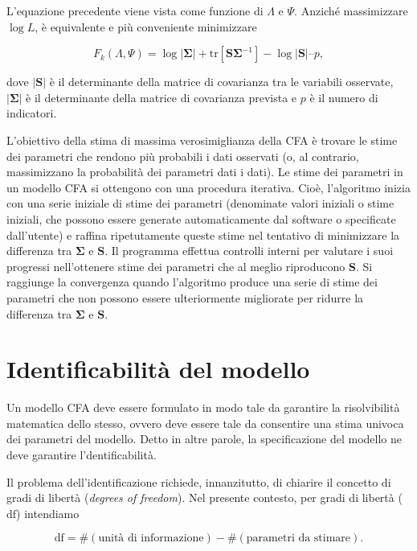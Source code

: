 \documentclass[
  11pt,
]{krantz}
\theoremstyle{definition}
\theoremstyle{definition}
\theoremstyle{definition}
\theoremstyle{definition}
\theoremstyle{remark}
\begin{document}
L'equazione precedente viene vista come funzione di \(\Lambda\) e \(\Psi\). Anziché massimizzare \(\log L\), è equivalente e più conveniente minimizzare

\[
F_{k}(\Lambda, \Psi) = \log |\boldsymbol{\Sigma}| + \mbox{tr}[\boldsymbol{S}\boldsymbol{\Sigma}^{-1}]  - \log|\boldsymbol{S}| – p,
\]

dove \(|\boldsymbol{S}|\) è il determinante della matrice di covarianza tra le variabili osservate, \(|\boldsymbol{\Sigma}|\) è il determinante della matrice di covarianza prevista e \(p\) è il numero di indicatori.

L'obiettivo della stima di massima verosimiglianza della CFA è trovare le stime dei parametri che rendono più probabili i dati osservati (o, al contrario, massimizzano la probabilità dei parametri dati i dati). Le stime dei parametri in un modello CFA si ottengono con una procedura iterativa. Cioè, l'algoritmo inizia con una serie iniziale di stime dei parametri (denominate valori iniziali o stime iniziali, che possono essere generate automaticamente dal software o specificate dall'utente) e raffina ripetutamente queste stime nel tentativo di minimizzare la differenza tra \(\boldsymbol{\Sigma}\) e \(\boldsymbol{S}\). Il programma effettua controlli interni per valutare i suoi progressi nell'ottenere stime dei parametri che al meglio riproducono \(\boldsymbol{S}\). Si raggiunge la convergenza quando l'algoritmo produce una serie di stime dei parametri che non possono essere ulteriormente migliorate per ridurre la differenza tra \(\boldsymbol{\Sigma}\) e \(\boldsymbol{S}\).

\hypertarget{identificabilituxe0-del-modello}{%
\section{Identificabilità del modello}\label{identificabilituxe0-del-modello}}

Un modello CFA deve essere formulato in modo tale da garantire la risolvibilità matematica dello stesso, ovvero deve essere tale da consentire una stima univoca dei parametri del modello. Detto in altre parole, la specificazione del modello ne deve garantire l'dentificabilità.

Il problema dell'identificazione richiede, innanzitutto, di chiarire il concetto di gradi di libertà (\emph{degrees of freedom}). Nel presente contesto, per gradi di libertà (\(\mbox{df}\)) intendiamo

\[
\mbox{df} = \# (\text{unità di informazione}) - \# (\text{parametri da stimare}).
\]
\end{document}
